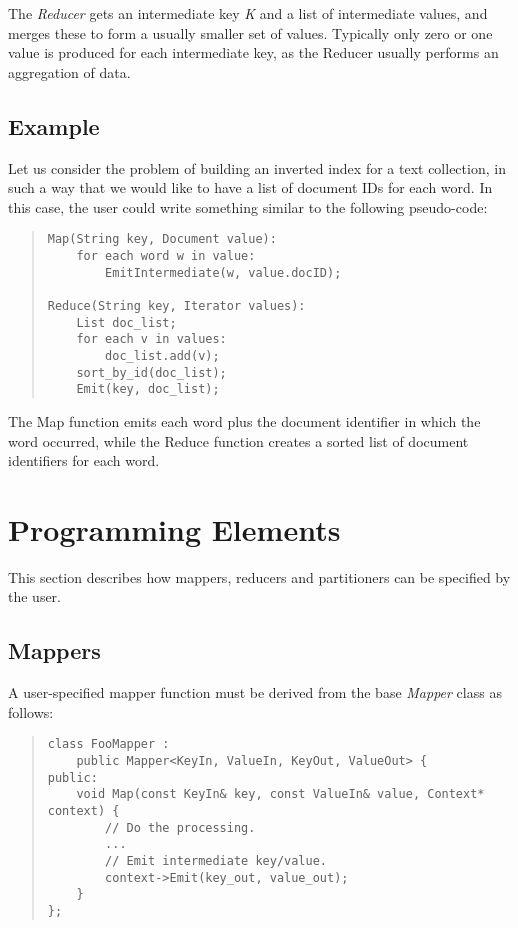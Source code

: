 \documentclass{article}
\begin{document}
The \emph{Reducer} gets an intermediate key \emph{K} and a list of intermediate values, and merges these to form a usually smaller set of values. Typically only zero or one value is produced for each intermediate key, as the Reducer usually performs an aggregation of data.

\subsection{Example}

Let us consider the problem of building an inverted index for a text collection, in such a way that we would like to have a list of document IDs for each word. In this case, the user could write something similar to the following pseudo-code:

\begin{quote}
\begin{verbatim}
Map(String key, Document value):
    for each word w in value:
        EmitIntermediate(w, value.docID);

Reduce(String key, Iterator values):
    List doc_list;
    for each v in values:
        doc_list.add(v);
    sort_by_id(doc_list);
    Emit(key, doc_list);

\end{verbatim}
\end{quote}

The Map function emits each word plus the document identifier in which the word occurred, while the Reduce function creates a sorted list of document identifiers for each word.


\section{Programming Elements}

This section describes how mappers, reducers and partitioners can be specified by the user.

\subsection{Mappers}

A user-specified mapper function must be derived from the base \emph{Mapper} class as follows:

\begin{quote}
\begin{verbatim}
class FooMapper :
    public Mapper<KeyIn, ValueIn, KeyOut, ValueOut> {
public:
    void Map(const KeyIn& key, const ValueIn& value, Context* context) {
        // Do the processing.
        ...
        // Emit intermediate key/value.
        context->Emit(key_out, value_out);
    }
};
\end{verbatim}
\end{quote}
\end{document}
